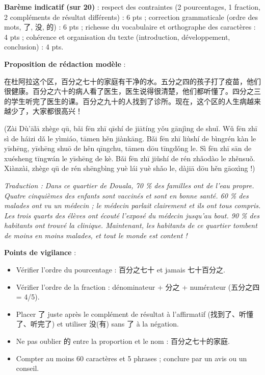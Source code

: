 \documentclass[11pt]{article}
\begin{document}
\begin{corrige}
\textbf{Barème indicatif (sur 20)} : respect des contraintes (2 pourcentages, 1 fraction, 2 compléments de résultat différents) : 6 pts ; correction grammaticale (ordre des mots, 了, 没, 的) : 6 pts ; richesse du vocabulaire et orthographe des caractères : 4 pts ; cohérence et organisation du texte (introduction, développement, conclusion) : 4 pts.

\textbf{Proposition de rédaction modèle} :

在杜阿拉这个区，百分之七十的家庭有干净的水。五分之四的孩子打了疫苗，他们很健康。百分之六十的病人看了医生，医生说得很清楚，他们都听懂了。四分之三的学生听完了医生的课。百分之九十的人找到了诊所。现在，这个区的人生病越来越少了，大家都很高兴！

(Zài Dù'ālā zhège qū, bǎi fēn zhī qīshí de jiātíng yǒu gānjìng de shuǐ. Wǔ fēn zhī sì de háizi dǎ le yìmiáo, tāmen hěn jiànkāng. Bǎi fēn zhī liùshí de bìngrén kàn le yīshēng, yīshēng shuō de hěn qīngchu, tāmen dōu tīngdǒng le. Sì fēn zhī sān de xuésheng tīngwán le yīshēng de kè. Bǎi fēn zhī jiǔshí de rén zhǎodào le zhěnsuǒ. Xiànzài, zhège qū de rén shēngbìng yuè lái yuè shǎo le, dàjiā dōu hěn gāoxìng !)

\emph{Traduction : Dans ce quartier de Douala, 70 \% des familles ont de l'eau propre. Quatre cinquièmes des enfants sont vaccinés et sont en bonne santé. 60 \% des malades ont vu un médecin ; le médecin parlait clairement et ils ont tous compris. Les trois quarts des élèves ont écouté l'exposé du médecin jusqu'au bout. 90 \% des habitants ont trouvé la clinique. Maintenant, les habitants de ce quartier tombent de moins en moins malades, et tout le monde est content !}

\textbf{Points de vigilance} :
\begin{itemize}
\item Vérifier l'ordre du pourcentage : 百分之七十 et jamais 七十百分之.
\item Vérifier l'ordre de la fraction : dénominateur + 分之 + numérateur (五分之四 = 4/5).
\item Placer 了 juste après le complément de résultat à l'affirmatif (找到了、听懂了、听完了) et utiliser 没(有) sans 了 à la négation.
\item Ne pas oublier 的 entre la proportion et le nom : 百分之七十的家庭.
\item Compter au moins 60 caractères et 5 phrases ; conclure par un avis ou un conseil.
\end{itemize}
\end{corrige}
\end{document}
